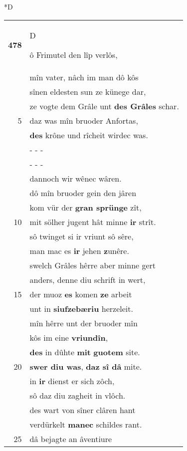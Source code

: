 \documentclass[8pt,a4paper,notitlepage]{article}
\begin{document}
\begin{table}[ht]
\begin{minipage}[t]{0.5\linewidth}
\small
\begin{center}*D
\end{center}
\begin{tabular}{rl}
\textbf{478} & \begin{large}D\end{large}ô Frimutel den lîp verlôs,\\ 
 & mîn vater, nâch im man dô kôs\\ 
 & sînen eldesten sun ze künege dar,\\ 
 & ze vogte dem Grâle unt \textbf{des Grâles} schar.\\ 
5 & daz was mîn bruoder Anfortas,\\ 
 & \textbf{des} krône und rîcheit wirdec was.\\ 
 & \multicolumn{1}{l}{ - - - }\\ 
 & \multicolumn{1}{l}{ - - - }\\ 
 & dannoch wir wênec wâren.\\ 
 & dô mîn bruoder gein den jâren\\ 
 & kom vür der \textbf{gran sprünge} zît,\\ 
10 & mit sölher jugent hât minne \textbf{ir} strît.\\ 
 & sô twinget si ir vriunt sô sêre,\\ 
 & man mac es \textbf{ir} jehen \textbf{z}unêre.\\ 
 & swelch Grâles hêrre aber minne gert\\ 
 & anders, denne diu schrift in wert,\\ 
15 & der muoz \textbf{es} komen \textbf{ze} arbeit\\ 
 & unt in \textbf{siufzebæriu} herzeleit.\\ 
 & mîn hêrre unt der bruoder mîn\\ 
 & kôs im eine \textbf{vriundîn},\\ 
 & \textbf{des} in dûhte \textbf{mit} \textbf{guotem} site.\\ 
20 & \textbf{swer diu was}, \textbf{daz sî dâ} mite.\\ 
 & in \textbf{ir} dienst er sich zôch,\\ 
 & sô daz diu zagheit in vlôch.\\ 
 & des wart von sîner clâren hant\\ 
 & verdürkelt \textbf{manec} schildes rant.\\ 
25 & dâ bejagte an âventiure\\ 

\end{tabular}
\end{minipage}
\end{table}
\end{document}

